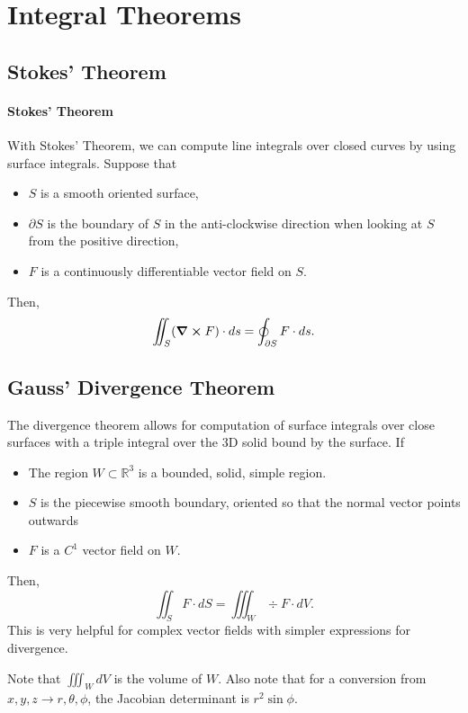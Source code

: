 \section{Integral Theorems}

\subsection{Stokes' Theorem}
\paragraph{Stokes' Theorem}
With Stokes' Theorem, we can compute line integrals over closed curves by
using surface integrals.
Suppose that
\begin{itemize}
    \item \(S\) is a smooth oriented surface,
    \item \(\partial S\) is the boundary of \(S\) in the anti-clockwise
    direction when looking at \(S\) from the positive direction,
    \item \(F\) is a continuously differentiable vector field on \(S\).
\end{itemize}

Then, \[
    \iint_S (\curl F) \cdot ds = \oint_{\partial S} F \cdot ds.
\]

\subsection{Gauss' Divergence Theorem}
The divergence theorem allows for computation of surface integrals
over close surfaces with a triple integral over the 3D solid bound by
the surface.
If 
\begin{itemize}
    \item The region \(W\subset \mathbb{R}^3\) is a bounded, solid, simple region.
    \item \(S\) is the piecewise smooth boundary, oriented so that the normal
    vector points outwards
    \item \(F\) is a \(C^1\) vector field on \(W\).
\end{itemize}
Then, \[
    \iint_S F\cdot dS = \iiint_W \div F \cdot dV.
\]
This is very helpful for complex vector fields with simpler expressions for
divergence.

Note that \(\iiint_W dV\) is the volume of \(W\).
Also note that for a conversion from \(x, y, z \to r, \theta, \phi\),
the Jacobian determinant is \(r^2 \sin \phi\).

